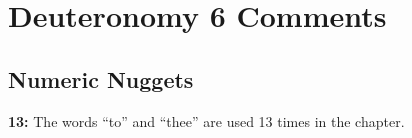 \section{Deuteronomy 6 Comments}

\subsection{Numeric Nuggets}
\textbf{13: } The words ``to'' and ``thee'' are used 13 times in the chapter.